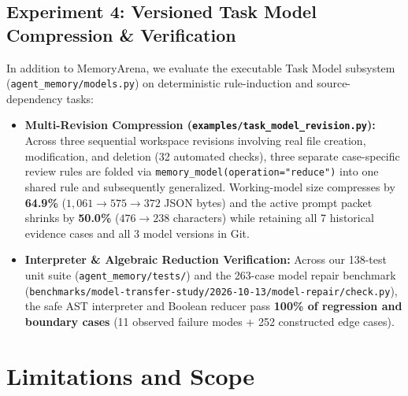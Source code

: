 \documentclass[11pt,a4paper]{article}
\begin{document}
\subsection{Experiment 4: Versioned Task Model Compression \& Verification}

In addition to MemoryArena, we evaluate the executable Task Model subsystem (\texttt{agent\_memory/models.py}) on deterministic rule-induction and source-dependency tasks:
\begin{itemize}[leftmargin=1.5em,itemsep=2pt]
    \item \textbf{Multi-Revision Compression (\texttt{examples/task\_model\_revision.py}):} Across three sequential workspace revisions involving real file creation, modification, and deletion (32 automated checks), three separate case-specific review rules are folded via \texttt{memory\_model(operation="reduce")} into one shared rule and subsequently generalized. Working-model size compresses by \textbf{64.9\%} ($1{,}061 \to 575 \to 372$ JSON bytes) and the active prompt packet shrinks by \textbf{50.0\%} ($476 \to 238$ characters) while retaining all 7 historical evidence cases and all 3 model versions in Git.
    \item \textbf{Interpreter \& Algebraic Reduction Verification:} Across our 138-test unit suite (\texttt{agent\_memory/tests/}) and the 263-case model repair benchmark (\texttt{benchmarks/model-transfer-study/2026-10-13/model-repair/check.py}), the safe AST interpreter and Boolean reducer pass \textbf{100\% of regression and boundary cases} (11 observed failure modes + 252 constructed edge cases).
\end{itemize}

\section{Limitations and Scope}
\end{document}
